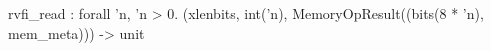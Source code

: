 rvfi_read : forall 'n, 'n > 0. (xlenbits, int('n), MemoryOpResult((bits(8 * 'n), mem_meta))) -> unit